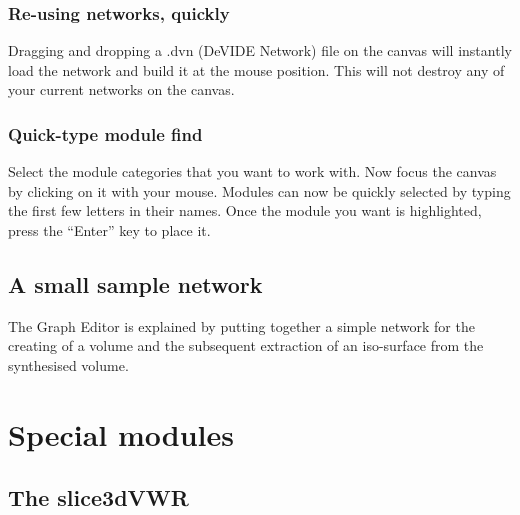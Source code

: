 \subsection{Re-using networks, quickly}
Dragging and dropping a .dvn (DeVIDE Network) file on the canvas will
instantly load the network and build it at the mouse position.  This
will not destroy any of your current networks on the canvas.

\subsection{Quick-type module find}
Select the module categories that you want to work with.  Now focus
the canvas by clicking on it with your mouse.  Modules can now be
quickly selected by typing the first few letters in their names.  Once
the module you want is highlighted, press the ``Enter'' key to place
it.

\section{A small sample network}
The Graph Editor is explained by putting together a simple network for
the creating of a volume and the subsequent extraction of an
iso-surface from the synthesised volume.

\chapter{Special modules}\label{secSpecialModules}
%
%
\setfooter{\thepage}{}{}{}{}{\thepage}%



\section{The slice3dVWR}

%

%
\setfooter{\thepage}{}{}{}{}{\thepage}%
\printindex%


